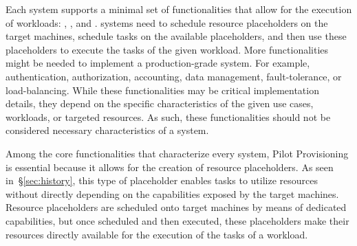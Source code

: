 \documentclass{sig-alternate}
\begin{document}
Each \pilotjob system supports a minimal set of functionalities that allow for
the execution of workloads: , , and . \pilotjob systems need to schedule
resource placeholders on the target machines, schedule tasks on the available
placeholders, and then use these placeholders to execute the tasks of the given
workload. More functionalities might be needed to implement a production-grade
\pilotjob system. For example, authentication, authorization, accounting, data
management, fault-tolerance, or load-balancing. While these functionalities may
be critical implementation details, they depend on the specific characteristics
of the given use cases, workloads, or targeted resources. As such, these
functionalities should not be considered necessary characteristics of a
\pilotjob system.

Among the core functionalities that characterize every \pilotjob system, Pilot
Provisioning is essential because it allows for the creation of resource
placeholders. As seen in~\S\ref{sec:history}, this type of placeholder enables
tasks to utilize resources without directly depending on the capabilities
exposed by the target machines. Resource placeholders are scheduled onto target
machines by means of dedicated capabilities, but once scheduled and then
executed, these placeholders make their resources directly available for the
execution of the tasks of a workload.



\end{document}
